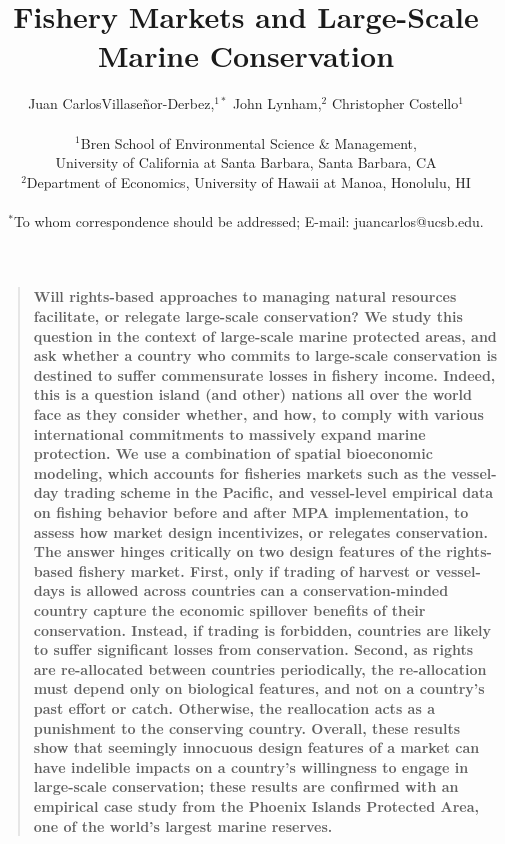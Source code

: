 \documentclass[12pt]{article}
\title{Fishery Markets and Large-Scale Marine Conservation}
\author{Juan CarlosVillase\~{n}or-Derbez,$^{1\ast}$ John Lynham,$^{2}$ Christopher Costello$^{1}$\\
\\
\normalsize{$^{1}$Bren School of Environmental Science \& Management,}\\
\normalsize{University of California at Santa Barbara, Santa Barbara, CA}\\
\normalsize{$^{2}$Department of Economics, University of Hawaii at Manoa, Honolulu, HI}\\
\\
\normalsize{$^\ast$To whom correspondence should be addressed; E-mail: juancarlos@ucsb.edu.}
}
\date{}
\newenvironment{sciabstract}{%
\begin{quote} \bf}
{\end{quote}}
\begin{document}

\baselineskip24pt


\maketitle



\begin{sciabstract}
Will rights-based approaches to managing natural resources facilitate, or relegate large-scale conservation? We study this question in the context of large-scale marine protected areas, and ask whether a country who commits to large-scale conservation is destined to suffer commensurate losses in fishery income.  Indeed, this is a question island (and other) nations all over the world face as they consider whether, and how, to comply with various international commitments to massively expand marine protection. We use a combination of spatial bioeconomic modeling, which accounts for fisheries markets such as the vessel-day trading scheme in the Pacific, and vessel-level empirical data on fishing behavior before and after MPA implementation, to assess how market design incentivizes, or relegates conservation. The answer hinges critically on two design features of the rights-based fishery market. First, only if trading of harvest or vessel-days is allowed across countries can a conservation-minded country capture the economic spillover benefits of their conservation.  Instead, if trading is forbidden, countries are likely to suffer significant losses from conservation. Second, as rights are re-allocated between countries periodically, the re-allocation must depend only on biological features, and not on a country's past effort or catch. Otherwise, the reallocation acts as a punishment to the conserving country. Overall, these results show that seemingly innocuous design features of a market can have indelible impacts on a country's willingness to engage in large-scale conservation; these results are confirmed with an empirical case study from the Phoenix Islands Protected Area, one of the world's largest marine reserves.
\end{sciabstract}



\end{document}
